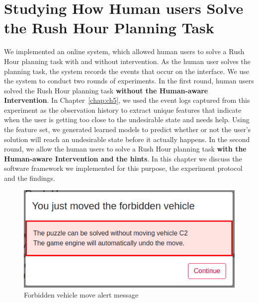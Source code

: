 \section{Studying How Human users Solve the Rush Hour Planning Task}
We implemented an online system, which allowed human users to solve a Rush Hour planning task with and without intervention. 
As the human user solves the planning task, the system records the events that occur on the interface.
We use the system to conduct two rounds of experiments.
In the first round, human users solved the Rush Hour planning task \textbf{without the Human-aware Intervention}.
In Chapter~\ref{chap:ch5}, we used the event logs captured from this experiment as the observation history \historyDef to extract unique features that indicate when the user is getting too close to the undesirable state and needs help. 
Using the feature set, we generated learned models to predict whether or not the user's solution will reach an undesirable state before it actually happens. 
In the second round, we allow the human users to solve a Rush Hour planning task \textbf{with the Human-aware Intervention and the hints}.
In this chapter we discuss the software framework we implemented for this purpose, the experiment protocol and the findings.

\begin{figure}[tpb]
  \centering
  \includegraphics[width=0.5\columnwidth, keepaspectratio=true]{img/badcaralert.png}
  \caption{Forbidden vehicle move alert message}
  \label{fig:badcar}
\end{figure}

